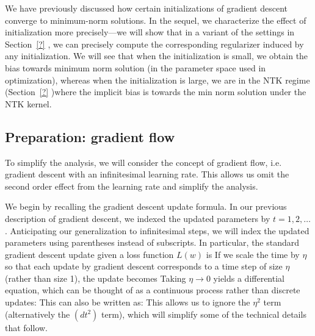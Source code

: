 
 

We have previously discussed how certain initializations of gradient descent converge to minimum-norm solutions. In the sequel, we characterize the effect of initialization more precisely---we will show that in a variant of the settings in Section~\ref{?} , we can precisely compute the corresponding regularizer induced by any initialization. We will see that when the initialization is small, we obtain the bias towards minimum norm solution (in the parameter space used in optimization), whereas when the initialization is large, we are in the NTK regime (Section~\ref{?} )where the implicit bias is towards the min norm solution under the NTK kernel. 

\subsection{Preparation: gradient flow}
To simplify the analysis, we will consider the concept of gradient flow, i.e. gradient descent with an infinitesimal learning rate.  This allows us omit the second order effect from the learning rate and simplify the analysis. 

We begin by recalling the gradient descent update formula. In our previous description of gradient descent, we indexed the updated parameters by $t = 1,2,\dots$. Anticipating our generalization to infinitesimal steps, we will index the updated parameters using parentheses instead of subscripts. In particular, the standard gradient descent update given a loss function $L(w)$ is
If we scale the time by $\eta$ so that each update by gradient descent corresponds to a time step of size $\eta$ (rather than size 1), the update becomes
Taking $\eta \to 0$ yields a differential equation, which can be thought of as a continuous process rather than discrete updates:
This can also be written as:
This allows us to ignore the $\eta^2$ term (alternatively the $(dt^2)$ term), which will simplify some of the technical details that follow.

